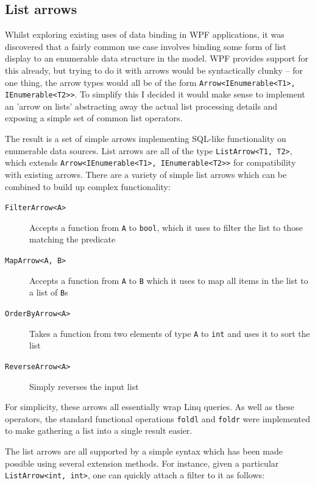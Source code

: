 \documentclass[12pt,twoside,notitlepage]{report}
\begin{document}
\subsection{List arrows}

Whilst exploring existing uses of data binding in WPF applications, it was discovered that a fairly common use case involves binding some form of list display to an enumerable data structure in the model. WPF provides support for this already, but trying to do it with arrows would be syntactically clunky -- for one thing, the arrow types would all be of the form \texttt{Arrow<IEnumerable<T1>, IEnumerable<T2>>}. To simplify this I decided it would make sense to implement an 'arrow on lists' abstracting away the actual list processing details and exposing a simple set of common list operators.

The result is a set of simple arrows implementing SQL-like functionality on enumerable data sources. List arrows are all of the type \texttt{ListArrow<T1, T2>}, which extends \texttt{Arrow<IEnumerable<T1>, IEnumerable<T2>>} for compatibility with existing arrows. There are a variety of simple list arrows which can be combined to build up complex functionality:

\begin{description}
	\item[\texttt{FilterArrow<A>}] Accepts a function from \texttt{A} to \texttt{bool}, which it uses to filter the list to those matching the predicate
	\item[\texttt{MapArrow<A, B>}] Accepts a function from \texttt{A} to \texttt{B} which it uses to map all items in the list to a list of \texttt{B}s
	\item[\texttt{OrderByArrow<A>}] Takes a function from two elements of type \texttt{A} to \texttt{int} and uses it to sort the list
	\item[\texttt{ReverseArrow<A>}] Simply reverses the input list
\end{description}

For simplicity, these arrows all essentially wrap Linq queries. As well as these operators, the standard functional operations \texttt{foldl} and \texttt{foldr} were implemented to make gathering a list into a single result easier.

The list arrows are all supported by a simple syntax which has been made possible using several extension methods. For instance, given a particular \texttt{ListArrow<int, int>}, one can quickly attach a filter to it as follows:
\end{document}
